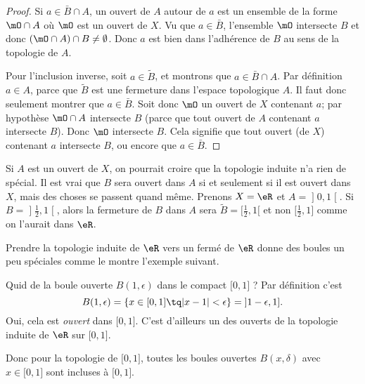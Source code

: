 \begin{proof}
    Si \( a\in \bar B\cap A\), un ouvert de \( A\) autour de \( a\) est un ensemble de la forme \( \mO\cap A\) où \( \mO\) est un ouvert de \( X\). Vu que \( a\in\bar B\), l'ensemble \( \mO\) intersecte \( B\) et donc \( (\mO\cap A)\cap B\neq \emptyset\). Donc \( a\) est bien dans l'adhérence de \( B\) au sens de la topologie de \( A\).

    Pour l'inclusion inverse, soit \( a\in \tilde  B\), et montrons que \( a\in \bar B\cap A\). Par définition \( a\in A\), parce que \( \tilde B\) est une fermeture dans l'espace topologique \( A\). Il faut donc seulement montrer que \( a\in\bar B\). Soit donc \( \mO\) un ouvert de \( X\) contenant \( a\); par hypothèse \( \mO\cap A\) intersecte \( B\) (parce que tout ouvert de \( A\) contenant \( a\) intersecte \( B\)). Donc \( \mO\) intersecte \( B\). Cela signifie que tout ouvert (de \( X\)) contenant \( a\) intersecte \( B\), ou encore que \( a\in \bar B\).
\end{proof}

\begin{example} \label{ExloeyoR}
    Si \( A\) est un ouvert de \( X\), on pourrait croire que la topologie induite n'a rien de spécial. Il est vrai que \( B\) sera ouvert dans \( A\) si et seulement si il est ouvert dans \( X\), mais des choses se passent quand même. Prenons \( X=\eR\) et \( A=\mathopen] 0 , 1 \mathclose[\). Si \( B=\mathopen] \frac{ 1 }{2} , 1 \mathclose[ \), alors la fermeture de \( B\) dans \( A\) sera \( \tilde B=\mathopen[ \frac{ 1 }{2} , 1 [\) et non \( \mathopen[ \frac{ 1 }{2} , 1 \mathclose]\) comme on l'aurait dans \( \eR\).
\end{example}

Prendre la topologie induite de \( \eR\) vers un fermé de \( \eR\) donne des boules un peu spéciales comme le montre l'exemple suivant.

\begin{example}  \label{ExKYZwYxn}
    Quid de la boule ouverte \( B(1,\epsilon)\) dans le compact \( \mathopen[ 0 , 1 \mathclose]\) ? Par définition c'est
    \begin{equation}
        B(1,\epsilon)=\{ x\in\mathopen[ 0 , 1 \mathclose]\tq | x-1 |<\epsilon \}=\mathopen] 1-\epsilon , 1 \mathclose].
    \end{equation}
    Oui, cela est \emph{ouvert} dans \( \mathopen[ 0 , 1 \mathclose]\). C'est d'ailleurs un des ouverts de la topologie induite de \( \eR\) sur \( \mathopen[ 0 , 1 \mathclose]\).

    Donc pour la topologie de \( \mathopen[ 0 , 1 \mathclose]\), toutes les boules ouvertes \( B(x,\delta)\) avec \( x\in\mathopen[ 0 , 1 \mathclose]\) sont incluses à \( \mathopen[ 0 , 1 \mathclose]\).
\end{example}



